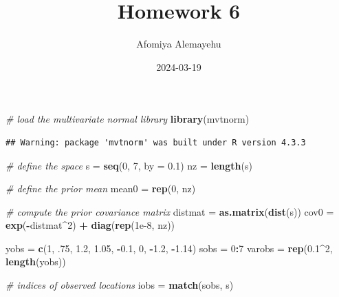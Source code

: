 \documentclass[
]{article}
\title{Homework 6}
\author{Afomiya Alemayehu}
\date{2024-03-19}
\newenvironment{Shaded}{\begin{snugshade}}{\end{snugshade}}
\newcommand{\AttributeTok}[1]{\textcolor[rgb]{0.13,0.29,0.53}{#1}}
\newcommand{\CommentTok}[1]{\textcolor[rgb]{0.56,0.35,0.01}{\textit{#1}}}
\newcommand{\DecValTok}[1]{\textcolor[rgb]{0.00,0.00,0.81}{#1}}
\newcommand{\FloatTok}[1]{\textcolor[rgb]{0.00,0.00,0.81}{#1}}
\newcommand{\FunctionTok}[1]{\textcolor[rgb]{0.13,0.29,0.53}{\textbf{#1}}}
\newcommand{\NormalTok}[1]{#1}
\newcommand{\OtherTok}[1]{\textcolor[rgb]{0.56,0.35,0.01}{#1}}
\newcommand{\SpecialCharTok}[1]{\textcolor[rgb]{0.81,0.36,0.00}{\textbf{#1}}}
\begin{document}
\maketitle

\begin{Shaded}
\begin{Highlighting}[]
\CommentTok{\# load the multivariate normal library}
\FunctionTok{library}\NormalTok{(mvtnorm)}
\end{Highlighting}
\end{Shaded}

\begin{verbatim}
## Warning: package 'mvtnorm' was built under R version 4.3.3
\end{verbatim}

\begin{Shaded}
\begin{Highlighting}[]
\CommentTok{\# define the space}
\NormalTok{s }\OtherTok{=} \FunctionTok{seq}\NormalTok{(}\DecValTok{0}\NormalTok{, }\DecValTok{7}\NormalTok{, }\AttributeTok{by =} \FloatTok{0.1}\NormalTok{)}
\NormalTok{nz }\OtherTok{=} \FunctionTok{length}\NormalTok{(s)}

\CommentTok{\# define the prior mean}
\NormalTok{mean0 }\OtherTok{=} \FunctionTok{rep}\NormalTok{(}\DecValTok{0}\NormalTok{, nz)}

\CommentTok{\# compute the prior covariance matrix}
\NormalTok{distmat }\OtherTok{=} \FunctionTok{as.matrix}\NormalTok{(}\FunctionTok{dist}\NormalTok{(s))}
\NormalTok{cov0 }\OtherTok{=} \FunctionTok{exp}\NormalTok{(}\SpecialCharTok{{-}}\NormalTok{distmat}\SpecialCharTok{\^{}}\DecValTok{2}\NormalTok{) }\SpecialCharTok{+} \FunctionTok{diag}\NormalTok{(}\FunctionTok{rep}\NormalTok{(}\FloatTok{1e{-}8}\NormalTok{, nz))}

\NormalTok{yobs }\OtherTok{=} \FunctionTok{c}\NormalTok{(}\DecValTok{1}\NormalTok{, .}\DecValTok{75}\NormalTok{, }\FloatTok{1.2}\NormalTok{, }\FloatTok{1.05}\NormalTok{, }\SpecialCharTok{{-}}\FloatTok{0.1}\NormalTok{, }\DecValTok{0}\NormalTok{, }\SpecialCharTok{{-}}\FloatTok{1.2}\NormalTok{, }\SpecialCharTok{{-}}\FloatTok{1.14}\NormalTok{)}
\NormalTok{sobs }\OtherTok{=} \DecValTok{0}\SpecialCharTok{:}\DecValTok{7}
\NormalTok{varobs }\OtherTok{=} \FunctionTok{rep}\NormalTok{(}\FloatTok{0.1}\SpecialCharTok{\^{}}\DecValTok{2}\NormalTok{, }\FunctionTok{length}\NormalTok{(yobs))}

\CommentTok{\# indices of observed locations}
\NormalTok{iobs }\OtherTok{=} \FunctionTok{match}\NormalTok{(sobs, s)}


\end{Highlighting}
\end{Shaded}
\end{document}
